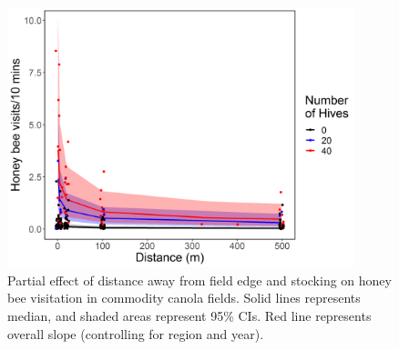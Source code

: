 \documentclass[12pt, draft]{article} %
\begin{document}
\begin{figure}
    \centering
    \includegraphics[width=0.9\textwidth,keepaspectratio=true]{slopeNumHivesDistVis.png}
    \caption[Partial effect of distance away from field edge and stocking on honey bee visitation in commodity canola fields]{Partial effect of distance away from field edge and stocking on honey bee visitation in commodity canola fields. Solid lines represents median, and shaded areas represent 95\% CIs. Red line represents overall slope (controlling for region and year).}
    \label{fig:hbeeDist_commodity}
\end{figure}
\end{document}
